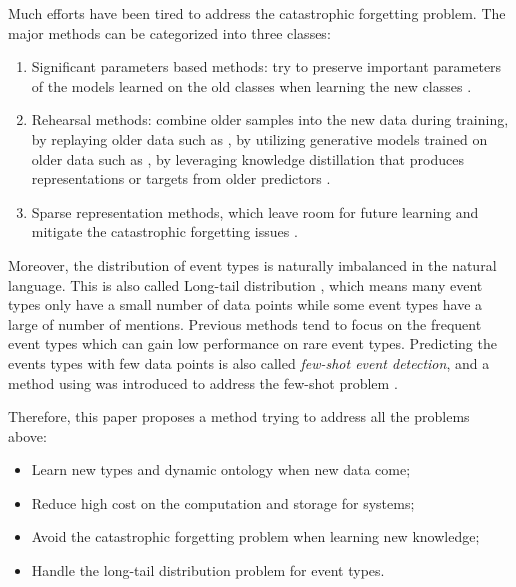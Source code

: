 Much efforts have been tired to address the catastrophic forgetting problem. The major methods can be categorized into three classes: 
\begin{enumerate}
  \item Significant parameters based methods: try to preserve important parameters of the models learned on the old classes when learning the new classes \citep{kirkpatrick2017overcoming, aljundi2018memory}.
  \item Rehearsal methods: combine older samples into the new data during training, by replaying older data such as \citet{rebuffi2017icarl, hou2019learning}, by utilizing generative models trained on older data such as \citet{shin2017continual}, by leveraging knowledge distillation that produces representations or targets from older predictors \citep{li2017learning, cao2020incremental}.
  \item Sparse representation methods, which leave room for future learning and mitigate the catastrophic forgetting issues \citep{liu2019utility, aljundi2018selfless}.
\end{enumerate}

Moreover, the distribution of event types is naturally imbalanced in the natural language. This is also called Long-tail distribution \citep{yu2021lifelong}, which means many event types only have a small number of data points while some event types have a large of number of mentions. Previous methods \citep{nguyen2016two, cao2020incremental} tend to focus on the frequent event types which can gain low performance on rare event types. Predicting the events types with few data points is also called \textit{few-shot event detection}, and a method using  was introduced to address the few-shot problem \citep{chen2021honey}.

Therefore, this paper proposes a method trying to address all the problems above:
\begin{itemize}
  \item Learn new types and dynamic ontology when new data come;
  \item Reduce high cost on the computation and storage for systems;
  \item Avoid the catastrophic forgetting problem when learning new knowledge;
  \item Handle the long-tail distribution problem for event types.
\end{itemize}

